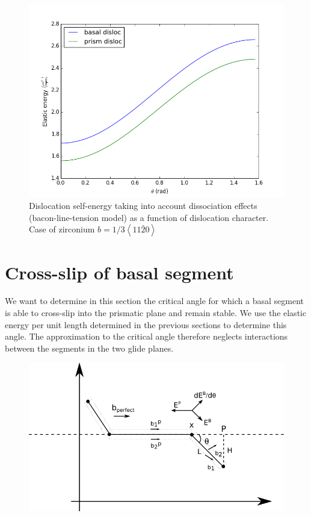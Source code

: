 \documentclass[10pt,a4paper,final]{article}
\begin{document}
\begin{figure}[htbp]
\centering
\includegraphics[scale=0.7]{png/zr_basal_prism}
\caption{Dislocation self-energy taking into account dissociation effects (bacon-line-tension model) as a function of dislocation character. Case of zirconium $b=1/3\left<11\bar{2}0\right>$}
\label{fig:zr}
\end{figure}
\pagebreak
\section{Cross-slip of basal segment}
We want to determine in this section the critical angle for which a basal segment is able to cross-slip into the prismatic plane and remain stable. We use the elastic energy per unit length determined in the previous sections to determine this angle. The approximation to the critical angle therefore neglects interactions between the segments in the two glide planes.\\

\begin{figure}[hbp]
\centering
\includegraphics[scale=1]{png/node_schema.png}
\label{fig:crossslip}
\end{figure}
\end{document}
